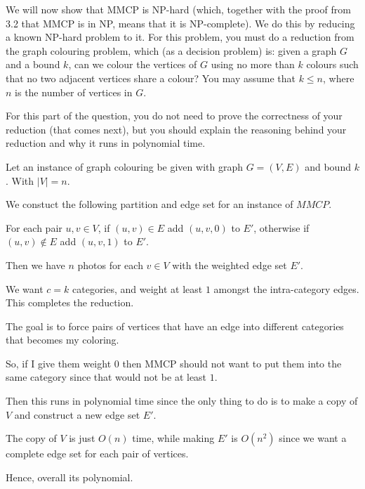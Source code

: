 \begin{questions}
	\ifsolutions\fi

	\question[4] We will now show that MMCP is NP-hard (which, together with the proof from 3.2 that MMCP is in NP, means that it is NP-complete). We do this by reducing a known NP-hard problem to it. For this problem, you must do a reduction from the graph colouring problem, which (as a decision problem) is: given a graph $G$ and a bound $k$, can we colour the vertices of $G$ using no more than $k$ colours such that no two adjacent vertices share a colour? You may assume that $k \le n$, where $n$ is the number of vertices in $G$.

	For this part of the question, you do not need to prove the correctness of your reduction (that comes next), but you should explain the reasoning behind your reduction and why it runs in polynomial time.

	\ifsolutions\fi

	\begin{soln}

		Let an instance of graph colouring be given with graph \(G = (V, E)\) and bound \(k\). With \(|V| = n\).

		We constuct the following partition and edge set for an instance of \(MMCP\).

		For each pair \(u, v \in V\), if \((u, v) \in E\) add \((u, v, 0)\) to \(E'\), otherwise if \((u, v) \notin E\) add \((u, v, 1)\) to \(E'\).

		Then we have \(n\) photos for each \(v \in V\) with the weighted edge set \(E'\).

		We want \(c = k\) categories, and weight at least \(1\) amongst the intra-category edges. This completes the reduction.

		The goal is to force pairs of vertices that have an edge into different categories that becomes my coloring.

		So, if I give them weight \(0\) then MMCP should not want to put them into the same category since that would not be at least \(1\).

		Then this runs in polynomial time since the only thing to do is to make a copy of \(V\) and construct a new edge set \(E'\).

		The copy of \(V\) is just \(O(n)\) time, while making \(E'\) is \(O(n^2)\) since we want a complete edge set for each pair of vertices.

		Hence, overall its polynomial.

	\end{soln}


\end{questions}
